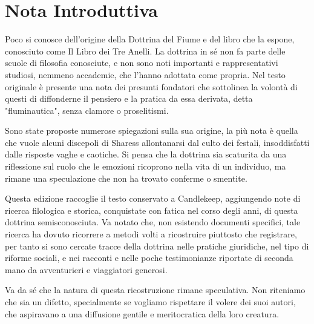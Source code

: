 \chapter{Nota Introduttiva}

Poco si conosce dell'origine della Dottrina del Fiume e del libro che la espone, conosciuto come
Il Libro dei Tre Anelli. La dottrina in sé non fa parte delle scuole di filosofia conosciute,
e non sono noti importanti e rappresentativi studiosi, nemmeno accademie, che l'hanno adottata
come propria.
Nel testo originale è presente una nota dei presunti fondatori che sottolinea
la volontà di questi di diffonderne il pensiero e la pratica da essa derivata, detta  "fluminautica", senza clamore o proselitismi.\par

Sono state proposte numerose spiegazioni sulla sua origine, la più nota è quella che
vuole alcuni discepoli di Sharess allontanarsi dal culto dei festali, insoddisfatti dalle
risposte vaghe e caotiche. Si pensa che la dottrina sia scaturita da una riflessione sul ruolo
che le emozioni ricoprono nella vita di un individuo, ma rimane una speculazione che non ha
trovato conferme o smentite.\par

Questa edizione raccoglie il testo conservato a Candlekeep, aggiungendo note di ricerca
filologica e storica, conquistate con fatica nel corso degli anni, di questa dottrina semisconosciuta.
Va notato che, non esistendo documenti specifici, tale ricerca ha dovuto ricorrere a metodi volti a
ricostruire piuttosto che registrare, per tanto si sono cercate tracce della dottrina nelle pratiche giuridiche,
nel tipo di riforme sociali, e nei racconti e nelle poche testimonianze riportate di seconda mano
da avventurieri e viaggiatori generosi.

Va da sé che la natura di questa ricostruzione rimane speculativa.
Non riteniamo che sia un difetto, specialmente se vogliamo rispettare il volere dei suoi autori, che aspiravano
a una diffusione gentile e meritocratica della loro creatura.
\cleardoublepage